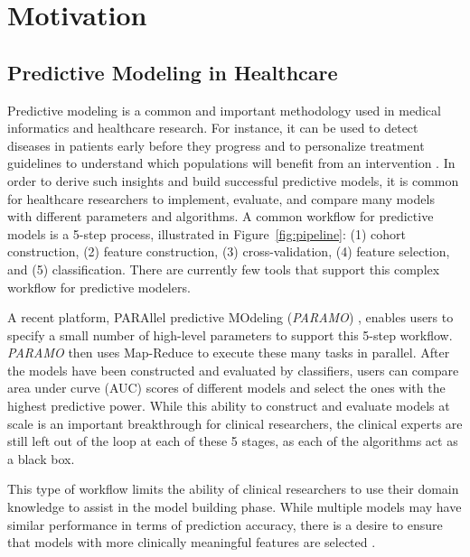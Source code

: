 
\section{Motivation}

\subsection{Predictive Modeling in Healthcare}
\label{sec:motivation_healthcare}
Predictive modeling is a common and important methodology used
in medical informatics and healthcare research.
For instance, it can be used to detect diseases in patients early
before they progress \cite{bellazzi2008predictive} and to
personalize treatment guidelines to understand which populations
will benefit from an intervention \cite{jensen2012mining}.
In order to derive such insights and build successful predictive models,
it is common for healthcare researchers to implement, evaluate,
and compare many models with different parameters and algorithms.
A common workflow for predictive models is a 5-step process,
illustrated in Figure~\ref{fig:pipeline}:
(1) cohort construction, (2) feature construction, (3) cross-validation,
(4) feature selection, and (5) classification.
There are currently few tools that support this complex
workflow for predictive modelers.

A recent platform, PARAllel predictive MOdeling (\textit{PARAMO}) \cite{paramo},
enables users to specify a small number of high-level parameters
to support this 5-step workflow.
\textit{PARAMO} then uses Map-Reduce to execute these many tasks in parallel.
After the models have been constructed and evaluated by classifiers,
users can compare area under curve (AUC) scores of different models and select the
ones with the highest predictive power.
While this ability to construct and evaluate models at scale is
an important breakthrough for clinical researchers, the clinical
experts are still left out of the loop at each of these 5 stages,
as each of the algorithms act as a black box.

This type of workflow limits the ability of clinical researchers to use
their domain knowledge to assist in the model building phase.
While multiple models may have similar performance in terms of
prediction accuracy, there is a desire to ensure that models
with more clinically meaningful features are selected
\cite{chen2006medical}.

